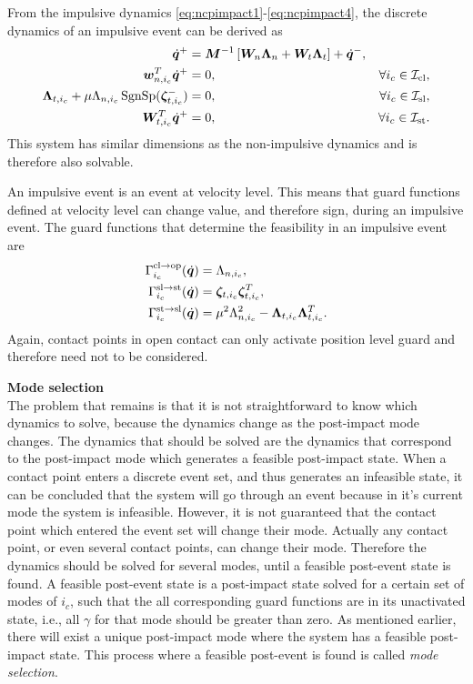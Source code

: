 \documentclass[../DC2017114Bouma.tex]{subfiles}
\begin{document}
From the impulsive dynamics \eqref{eq:ncpimpact1}-\eqref{eq:ncpimpact4}, the discrete dynamics of an impulsive event can be derived as
\begin{align}
\dot{{\boldsymbol{q}}}^+ &= {\boldsymbol{M}}^{-1}\left[{\boldsymbol{W}}_{n}\boldsymbol{\Lambda}_{n} + {\boldsymbol{W}}_{t}\boldsymbol{\Lambda}_{t}\right] + \dot{{\boldsymbol{q}}}^-, \label{eq:2imp1}\\
{\boldsymbol{w}}^T_{n,i_c}\dot{{\boldsymbol{q}}}^+ &= 0, &\forall i_c\in\mathcal{I}_{\text{cl}},\label{eq:2imp2}\\
\boldsymbol{\Lambda}_{t,i_c} + \mu\Lambda_{n,i_c}\operatorname{\text{SgnSp}}(\boldsymbol{\zeta}^-_{t,i_c})&= 0, &\forall i_c\in\mathcal{I}_{\text{sl}},\label{eq:2imp3}\\
{\boldsymbol{W}}^T_{t,i_c}\dot{{\boldsymbol{q}}}^+ &= 0, &\forall i_c\in\mathcal{I}_{\text{st}}.\label{eq:2imp4}
\end{align}
This system has similar dimensions as the non-impulsive dynamics and is therefore also solvable.

An impulsive event is an event at velocity level. This means that guard functions defined at velocity level can change value, and therefore sign, during an impulsive event. The guard functions that determine the feasibility in an impulsive event are
\begin{align}
\Gamma^{\text{cl}\rightarrow\text{op}}_{i_c}(\dot{{\boldsymbol{q}}}) &= \Lambda_{n,i_c},\\
\Gamma^{\text{sl}\rightarrow\text{st}}_{i_c}(\dot{{\boldsymbol{q}}}) &= \boldsymbol{\zeta}_{t,i_c}\boldsymbol{\zeta}_{t,i_c}^T,\\
\Gamma^{\text{st}\rightarrow\text{sl}}_{i_c}(\dot{{\boldsymbol{q}}}) &= \mu^2\Lambda_{n,i_c}^2 - \boldsymbol{\Lambda}_{t,i_c}\boldsymbol{\Lambda}_{t,i_c}^T.
\end{align}
Again, contact points in open contact can only activate position level guard and therefore need not to be considered.

\textbf{Mode selection}\\
The problem that remains is that it is not straightforward to know which dynamics to solve, because the dynamics change as the post-impact mode changes. The dynamics that should be solved are the dynamics that correspond to the post-impact mode which generates a feasible post-impact state. When a contact point enters a discrete event set, and thus generates an infeasible state, it can be concluded that the system will go through an event because in it's current mode the system is infeasible. However, it is not guaranteed that the contact point which entered the event set will change their mode. Actually any contact point, or even several contact points, can change their mode. Therefore the dynamics should be solved for several modes, until a feasible post-event state is found. A feasible post-event state is a post-impact state solved for a certain set of modes of $i_c$, such that the all corresponding guard functions are in its unactivated state, i.e., all $\gamma$ for that mode should be greater than zero. As mentioned earlier, there will exist a unique post-impact mode where the system has a feasible post-impact state. This process where a feasible post-event is found is called \textit{mode selection}.
\end{document}
